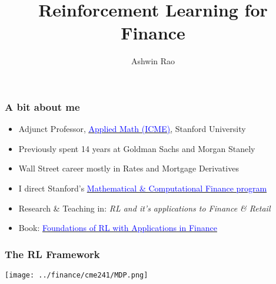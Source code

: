 \documentclass[handout]{beamer}
\title[RL for Finance]{Reinforcement Learning for Finance} %
\author{Ashwin Rao} %
\institute[Stanford] %
{Stanford University
}
\date{} %
\begin{document}
\begin{frame}
\titlepage %
\end{frame}



\begin{frame}
\frametitle{A bit about me}
\pause
\begin{itemize}[<+->]
\item Adjunct Professor, \href{https://icme.stanford.edu/}{\underline{\textcolor{blue}{Applied Math (ICME)}}}, Stanford University
\item Previously spent 14 years at Goldman Sachs and Morgan Stanely
\item Wall Street career mostly in Rates and Mortgage Derivatives
\item I direct Stanford's \href{https://mcf.stanford.edu/}{\underline{\textcolor{blue}{Mathematical \& Computational Finance program}}}
\item Research \& Teaching in: {\em RL and it's applications to Finance \& Retail}
\item Book:  \href{http://stanford.edu/~ashlearn/RLForFinanceBook/book.pdf}{\underline{\textcolor{blue}{Foundations of RL with Applications in Finance}}}

\end{itemize}
\end{frame}


\begin{frame}
\frametitle{The RL Framework}
\texttt{[image: ../finance/cme241/MDP.png]}
\end{frame}
\end{document}
